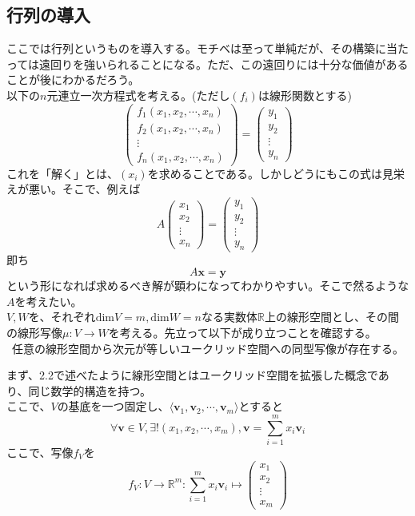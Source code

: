 \documentclass[dvipdfmx]{jsarticle}
\begin{document}
\subsection{行列の導入}
ここでは行列というものを導入する。モチベは至って単純だが、その構築に当たっては遠回りを強いられることになる。ただ、この遠回りには十分な価値があることが後にわかるだろう。\\
\motiv 以下の$n$元連立一次方程式を考える。(ただし$(f_i)$は線形関数とする)
\[\begin{pmatrix}f_1(x_1,x_2,\cdots,x_n)\\f_2(x_1,x_2,\cdots,x_n)\\\vdots\\f_n(x_1,x_2,\cdots,x_n)\end{pmatrix}=\begin{pmatrix}y_1\\y_2\\\vdots\\y_n\end{pmatrix}\]
これを「解く」とは、$(x_i)$を求めることである。しかしどうにもこの式は見栄えが悪い。そこで、例えば
\[A\begin{pmatrix}x_1\\x_2\\\vdots\\x_n\end{pmatrix}=\begin{pmatrix}y_1\\y_2\\\vdots\\y_n\end{pmatrix}\]
即ち
\[A\bm{x}=\bm{y}\]
という形になれば求めるべき解が顕わになってわかりやすい。そこで然るような$A$を考えたい。\\
\build $V,W$を、それぞれ$\mathrm{dim}V=m,\mathrm{dim}W=n$なる実数体$\mathbb{R}$上の線形空間とし、その間の線形写像$\mu:V \to W$を考える。先立って以下が成り立つことを確認する。\\
~任意の線形空間から次元が等しいユークリッド空間への同型写像が存在する。\\\par
まず、2.2で述べたように線形空間とはユークリッド空間を拡張した概念であり、同じ数学的構造を持つ。\\
ここで、$V$の基底を一つ固定し、$\langle\bm{v}_1,\bm{v}_2,\cdots,\bm{v}_m\rangle$とすると
\[\forall \bm{v} \in V,\exists ! (x_1,x_2,\cdots,x_m),\bm{v}=\sum_{i=1}^mx_i\bm{v}_i\]
ここで、写像$f_V$を
\[f_V:V\to\mathbb{R}^m:\sum_{i=1}^mx_i\bm{v}_i\mapsto\begin{pmatrix}x_1\\x_2\\\vdots\\x_m\end{pmatrix}\]
\end{document}
